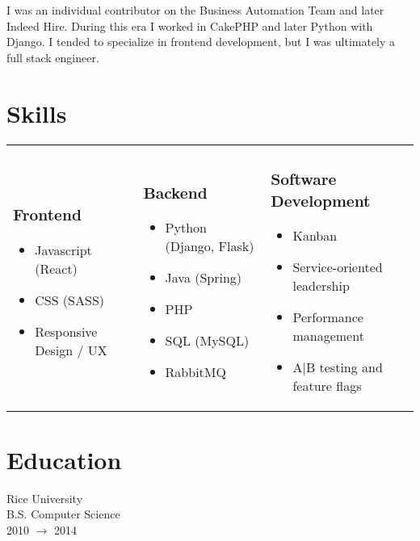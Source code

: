 \documentclass[11pt]{amsart}
\begin{document}
%
%
\begin{tcolorbox}[
	title=Software Engineer \textcolor{DarkGray}{/} Indeed,
	after title={\hfill2014 \textcolor{DarkGray}{$\rightarrow$} 2017 \textcolor{DarkGray}{(3 years)}}
]
I was an individual contributor on the Business Automation Team and later Indeed Hire. During this era I worked in CakePHP and later Python with Django. I tended to specialize in frontend development, but I was ultimately a full stack engineer.
\end{tcolorbox}

\section{Skills}
\begin{tabularx}{\textwidth}{X X X}
{
	\subsubsection{Frontend}
	\begin{itemize}[noitemsep, leftmargin=1em, label=\raisebox{0.25ex}{\tiny$\bullet$}]
		\item Javascript (React)
		\item CSS (SASS)
		\item Responsive Design / UX
	\end{itemize}
}&
{
	\subsubsection{Backend}
	\begin{itemize}[noitemsep, leftmargin=1em, label=\raisebox{0.25ex}{\tiny$\bullet$}]
		\item Python (Django, Flask)
		\item Java (Spring)
		\item PHP
		\item SQL (MySQL)
		\item RabbitMQ
	\end{itemize}
}&
{
	\subsubsection{Software Development}
	\begin{itemize}[noitemsep, leftmargin=1em, label=\raisebox{0.25ex}{\tiny$\bullet$}]
		\item Kanban
		\item Service-oriented leadership
		\item Performance management
		\item A|B testing and feature flags
	\end{itemize}
}
\end{tabularx}

\section{Education}
 
Rice University \\
B.S. Computer Science \\
 2010 $\rightarrow$  2014

\end{document}

